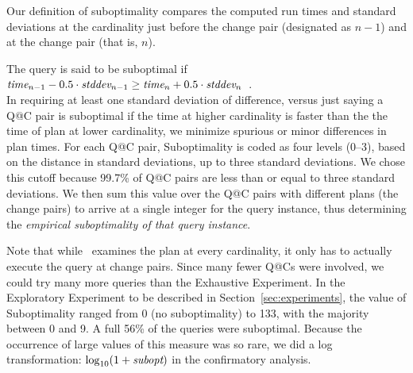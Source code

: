\documentclass[prodmode,acmtods]{acmsmall}
\makeatletter
\def\azdb{\doubleblind{\hbox{\sc AZDBLab}}{\hbox{\sc DBLab}}}
\def\QatC{Q{@}C}
\makeatother
\begin{document}
Our definition of suboptimality compares the computed run times 
and standard deviations at the cardinality just before the change
pair (designated as $n-1$) and at the change pair (that is, $n$).

The query is said to be suboptimal if
$\hbox{\em time}_{n-1} - 0.5 \cdot \hbox{\em stddev}_{n-1} \geq \hbox{\em
time}_n + 0.5 \cdot \hbox{\em stddev}_n$~.\\
In requiring at least one standard deviation of difference, versus just saying a Q@C pair is suboptimal if the time at higher cardinality is faster than the the time of plan at lower cardinality, we minimize spurious or minor differences in plan times. 
For each Q@C pair, Suboptimality is coded as four levels (0--3), based on the distance in 
standard deviations, up to three standard deviations. We chose this cutoff
because 99.7\% of Q@C pairs are less than or equal to three standard
deviations.
We then sum this value over the Q@C pairs with different plans
(the change pairs) to arrive at a single integer for the query instance,
thus determining the {\em empirical suboptimality of that query instance}.

Note that while \azdb\ examines the plan at every cardinality, it only has
to actually execute the query at change
pairs.  Since many fewer {\QatC}s were involved, we could try many more
queries than the \hbox{Exhaustive} \hbox{Experiment}. In the Exploratory Experiment to be
described in Section~\ref{sec:experiments}, the value of Suboptimality ranged
from 0 (no suboptimality) to 133, with the majority between 0 and 9. A full 56\% of
the queries were suboptimal.  \hbox{Because} the occurrence of large values of this
measure was so rare, we did a log transformation: $\log_{10} (1 + \mbox{\em
  subopt})$ in the confirmatory analysis.
\end{document}
